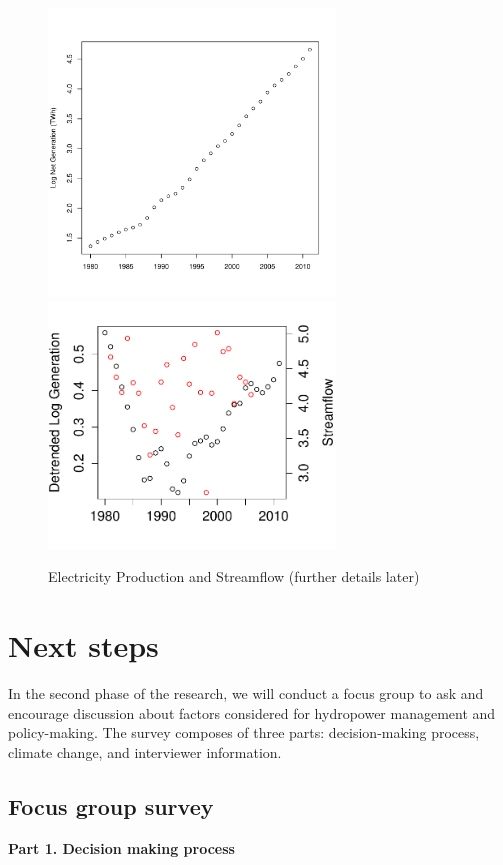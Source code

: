 \documentclass[11pt,english]{article}
\theoremstyle{plain} \newtheorem{claim}{Claim}
\theoremstyle{plain} \newtheorem{prop}{Proposition}
\theoremstyle{plain} \newtheorem{hypo}{Hypothesis}
\begin{document}
\begin{figure}
\includegraphics[width=3in]{displays/loggen.pdf}
\includegraphics[width=3in]{displays/correlation.pdf}
\label{fig:loggen}
\caption{Electricity Production and Streamflow (further details later)}  
\end{figure}

\section{Next steps}

In the second phase of the research, we will conduct a focus group to ask and encourage discussion about factors considered for hydropower management and policy-making. The survey composes of three parts: decision-making process, climate change, and interviewer information. 

\subsection{Focus group survey}

\textbf{Part 1. Decision making process}
\end{document}
